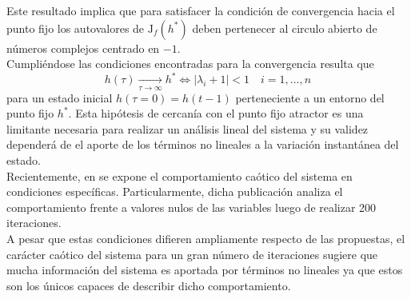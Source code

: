 \documentclass{article}
\begin{document}
	Este resultado implica que para satisfacer la condición de convergencia hacia el punto fijo los autovalores de $\mathrm{J}_f(h^*)$ deben pertenecer al circulo abierto de números complejos centrado en $-1$.\\
	Cumpliéndose las condiciones encontradas para la convergencia resulta que
	\begin{equation*}
	h(\tau) \xrightarrow[\tau \to \infty]{} h^* \iff |\lambda_i + 1| < 1 \quad i = 1, ..., n
	\end{equation*}
	para un estado inicial $h(\tau = 0) = h(t-1)$ perteneciente a un entorno del punto fijo $h^*$. Esta hipótesis de cercanía con el punto fijo atractor es una limitante necesaria para realizar un análisis lineal del sistema y su validez dependerá de el aporte de los términos no lineales a la variación instantánea del estado.\\
	Recientemente, en \cite{11Laurent} se expone el comportamiento caótico del sistema en condiciones específicas. Particularmente, dicha publicación analiza el comportamiento frente a valores nulos de las variables luego de realizar 200 iteraciones.\\
	A pesar que estas condiciones difieren ampliamente respecto de las propuestas, el carácter caótico del sistema para un gran número de iteraciones sugiere que mucha información del sistema es aportada por términos no lineales ya que estos son los únicos capaces de describir dicho comportamiento\cite{21StrogatzBook}.\\
	
\end{document}

